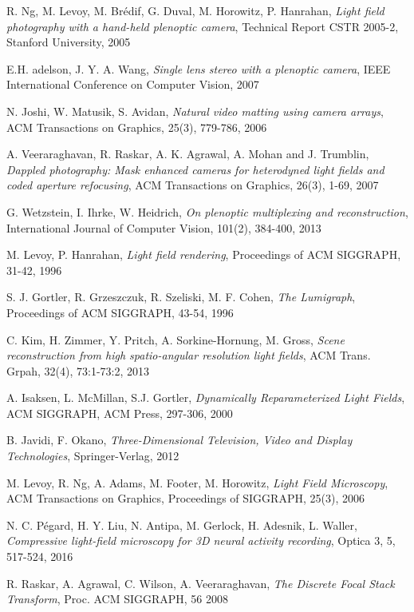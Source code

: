 \documentclass[11pt, english, singlespacing, headsepline, ]{MastersDoctoralThesis}
\theoremstyle{definition}
\begin{document}
\begin{thebibliography}{90}
	R. Ng, M. Levoy, M. Br\'edif, G. Duval, M. Horowitz, P. Hanrahan,
	\emph{Light field photography with a hand-held plenoptic camera},
	Technical Report CSTR 2005-2, Stanford University, 
	2005

	E.H. adelson, J. Y. A. Wang,
	\emph{Single lens stereo with a plenoptic camera},
	IEEE International Conference on Computer Vision, 
	2007

	N. Joshi, W. Matusik, S. Avidan,
	\emph{Natural video matting using camera arrays},
	ACM Transactions on Graphics, 25(3), 779-786,
	2006

	A. Veeraraghavan, R. Raskar, A. K. Agrawal, A. Mohan and J. Trumblin, 
	\emph{Dappled photography: Mask enhanced cameras for heterodyned light fields and coded aperture refocusing},
	ACM Transactions on Graphics, 26(3), 1-69,
	2007

	G. Wetzstein, I. Ihrke, W. Heidrich,
	\emph{On plenoptic multiplexing and reconstruction},
	International Journal of Computer Vision, 101(2), 384-400,
	2013

	M. Levoy, P. Hanrahan,
	\emph{Light field rendering},
	Proceedings of ACM SIGGRAPH, 31-42,
	1996

	S. J. Gortler, R. Grzeszczuk, R. Szeliski, M. F. Cohen, 
	\emph{The Lumigraph},
	Proceedings of ACM SIGGRAPH, 43-54,
	1996

	C. Kim, H. Zimmer, Y. Pritch, A. Sorkine-Hornung, M. Gross,
	\emph{Scene reconstruction from high spatio-angular resolution light fields},
	ACM Trans. Grpah, 32(4), 73:1-73:2, 
	2013 

	A. Isaksen, L. McMillan, S.J. Gortler, 
	\emph{Dynamically Reparameterized Light Fields},
	ACM SIGGRAPH, ACM Press, 297-306,
	2000

	B. Javidi, F. Okano, 
	\emph{Three-Dimensional Television, Video and Display Technologies},
	Springer-Verlag,
	2012

	M. Levoy, R. Ng, A. Adams, M. Footer, M. Horowitz,
	\emph{Light Field Microscopy},
	ACM Transactions on Graphics, Proceedings of SIGGRAPH, 25(3),
	2006

	N. C. P\'egard, H. Y. Liu, N. Antipa, M. Gerlock, H. Adesnik, L. Waller,
	\emph{Compressive light-field microscopy for 3D neural activity recording},
	Optica 3, 5, 517-524,
	2016

	R. Raskar, A. Agrawal, C. Wilson, A. Veeraraghavan,
	\emph{The Discrete Focal Stack Transform},
	Proc. ACM SIGGRAPH, 56
	2008


\end{thebibliography}
\end{document}
